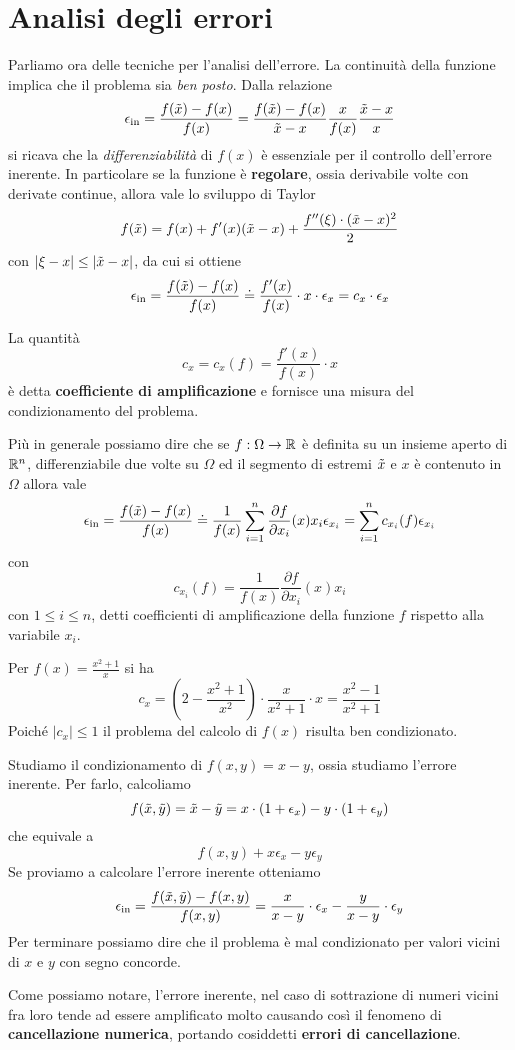 \section{Analisi degli errori}
Parliamo ora delle tecniche per l'analisi dell'errore. La continuità della funzione implica che il problema sia
\emph{ben posto}. Dalla relazione
\[
	\epsilon_\text{in} = \frac{f(\tilde{x}) - f(x)}{f(x)} =
	\frac{f(\tilde{x}) - f(x)}{\tilde{x} - x} \frac{x}{f(x)} \frac{\tilde{x} - x}{x}
\]
si ricava che la \emph{differenziabilità} di $f(x)$ è essenziale per il controllo dell'errore inerente. In
particolare se la funzione è \textbf{regolare}, ossia derivabile volte con derivate continue, allora vale
lo sviluppo di Taylor
\[ f(\tilde{x}) = f(x) + f'(x) (\tilde{x} - x) + \frac{f''(\xi) \cdot (\tilde{x} - x)^2}{2} \]
con $|\xi - x| \leq |\tilde{x} - x|$, da cui si ottiene
\[
	\epsilon_\text{in} = \frac{f(\tilde{x}) - f(x)}{f(x)} \doteq \frac{f'(x)}{f(x)} \cdot x \cdot \epsilon_x
	= c_x \cdot \epsilon_x
\]
\begin{definition}
	La quantità
	\[ c_x = c_x (f) = \frac{f'(x)}{f(x)} \cdot x \]
	è detta \textbf{coefficiente di amplificazione} e fornisce una misura del condizionamento del problema.
\end{definition}

Più in generale possiamo dire che se $f : \Omega \to \mathbb{R}$ è definita su un insieme aperto di $\mathbb{R}^n$, differenziabile
due volte su $\Omega$ ed il segmento di estremi $\tilde{x}$ e $x$ è contenuto in $\Omega$ allora vale
\[
	\epsilon_\text{in} = \frac{f(\tilde{x}) - f(x)}{f(x)} \doteq
	\frac{1}{f(x)} \sum_{i=1}^n \frac{\partial f}{\partial x_i} (x) x_i \epsilon_{x_i} =
	\sum_{i=1}^n c_{x_i} (f) \epsilon_{x_i}
\]
con
\[ c_{x_i} (f) = \frac{1}{f(x)} \frac{\partial f}{\partial x_i} (x) x_i \]
con $1 \leq i \leq n$, detti coefficienti di amplificazione della funzione $f$ rispetto alla variabile $x_i$.

\begin{example}
	Per $f(x) = \frac{x^2 + 1}{x}$ si ha
	\[
		c_x = \left( 2 - \frac{x^2 + 1}{x^2} \right) \cdot \frac{x}{x^2 + 1} \cdot x =
		\frac{x^2 - 1}{x^2 + 1}
	\]
	Poiché $|c_x| \leq 1$ il problema del calcolo di $f(x)$ risulta ben condizionato.
\end{example}

\begin{example}
	Studiamo il condizionamento di $f(x, y) = x - y$, ossia studiamo l'errore inerente. Per farlo, calcoliamo
	\[ f(\tilde{x}, \tilde{y}) = \tilde{x} - \tilde{y} = x \cdot (1 + \epsilon_x) - y \cdot (1 + \epsilon_y) \]
	che equivale a
	\[ f(x, y) + x \epsilon_x - y \epsilon_y \]
	Se proviamo a calcolare l'errore inerente otteniamo
	\[
		\epsilon_\text{in} = \frac{f(\tilde{x}, \tilde{y}) - f(x, y)}{f(x, y)} =
		\frac{x}{x - y} \cdot \epsilon_x - \frac{y}{x - y} \cdot \epsilon_y
	\]
	Per terminare possiamo dire che il problema è mal condizionato per valori vicini di $x$ e $y$ con segno
	concorde.
\end{example}
Come possiamo notare, l'errore inerente, nel caso di sottrazione di numeri vicini fra loro tende ad essere
amplificato molto causando così il fenomeno di \textbf{cancellazione numerica}, portando cosiddetti
\textbf{errori di cancellazione}.


